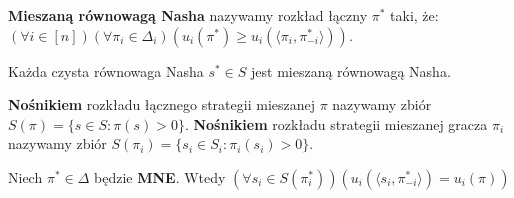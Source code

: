 \begin{definicja}
    \textbf{Mieszaną równowagą Nasha} nazywamy rozkład łączny $\pi^{*}$ taki, że:
    $(\forall i \in [n])(\forall \pi_i \in \Delta_i)(u_i(\pi^{*}) \geq u_i(\langle \pi_i, \pi_{-i}^{*} \rangle))$.
\end{definicja}
\begin{twierdzenie}
    Każda czysta równowaga Nasha $s^{*} \in S$ jest mieszaną równowagą Nasha.
\end{twierdzenie}
\begin{definicja}
    \textbf{Nośnikiem} rozkładu łącznego strategii mieszanej $\pi$ nazywamy zbiór
    $S(\pi) = \{s \in S : \pi(s) > 0\}$.
    \textbf{Nośnikiem} rozkładu strategii mieszanej gracza $\pi_i$ nazywamy zbiór
    $S(\pi_i) = \{s_i \in S_i :\pi_i(s_i) > 0\}$.
\end{definicja}
\begin{twierdzenie}
    Niech $\pi^{*} \in \Delta$ będzie \textbf{MNE}.
    Wtedy $(\forall s_i \in S(\pi_{i}^{*}))(u_i(\langle s_i, \pi_{-i}^{*} \rangle) = u_i(\pi))$
\end{twierdzenie}
